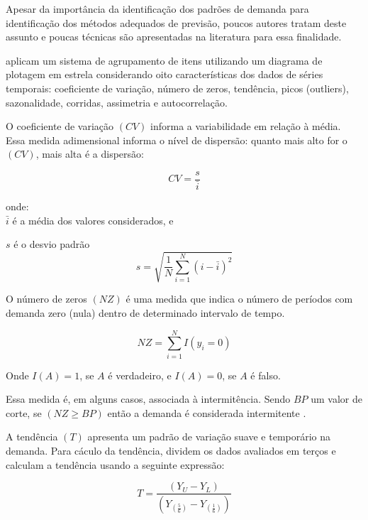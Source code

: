 \documentclass[11pt,letterpaper,twocolumn]{article}
\begin{document}
Apesar da importância da identificação dos padrões de demanda para identificação dos métodos adequados de previsão, poucos autores tratam deste assunto e poucas técnicas são apresentadas na literatura para essa finalidade.

\cite{BusingerRead1999} aplicam um sistema de agrupamento de itens utilizando um diagrama de plotagem em estrela considerando oito características dos dados de séries temporais: coeficiente de variação, número de zeros, tendência, picos (outliers), sazonalidade, corridas, assimetria e autocorrelação.

O coeficiente de variação $(CV)$ informa a variabilidade em relação à média. Essa medida adimensional informa o nível de dispersão: quanto mais alto for o $(CV)$, mais alta é a dispersão:

\begin{equation}
CV = \frac{s}{\bar{i}}
\end{equation}

onde: \\

$\bar{i}$ é a média dos valores considerados, e

$s$ é o desvio padrão \\

\begin{equation}
s = \sqrt{ \frac{1}{N} \sum_{i=1}^{N}{(i-\bar{i})^2}}
\end{equation}

O número de zeros $(NZ)$ é uma medida que indica o número de períodos com demanda zero (nula) dentro de determinado intervalo de tempo. 

\begin{equation}
NZ = \sum_{i=1}^{N}{I(y_i=0)}
\end{equation}

Onde $I(A)=1$, se $A$ é verdadeiro, e $I(A)=0$, se $A$ é falso.

Essa medida é, em alguns casos, associada à intermitência. Sendo $BP$ um valor de corte, se $(NZ\geq BP)$ então a demanda é considerada intermitente \citep{BoylanEtAl2008}.

A tendência $(T)$ apresenta um padrão de variação suave e temporário na demanda. Para cáculo da tendência, \cite{BusingerRead1999} dividem os dados avaliados em terços e calculam a tendência usando a seguinte expressão:

\begin{equation}
T = \frac{(Y_U - Y_L)}{(Y_{(\frac{5}{6})} - Y_{(\frac{1}{6})})}
\end{equation}
\end{document}
